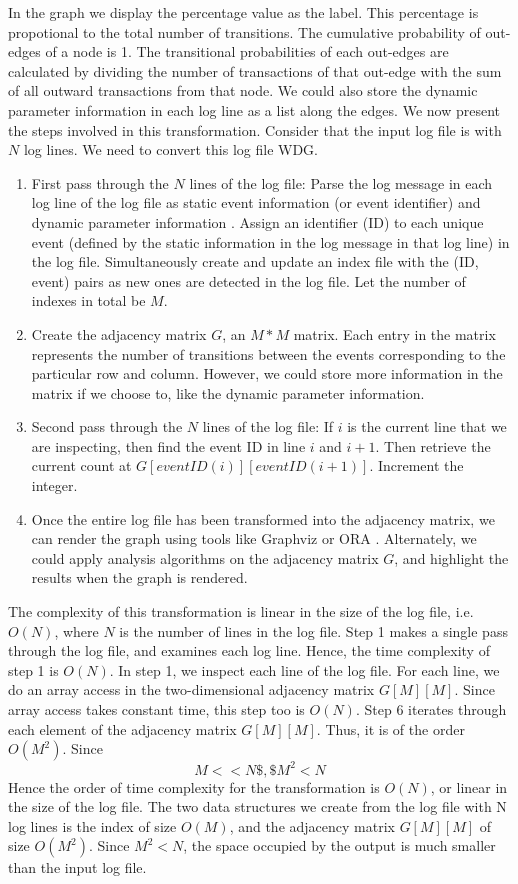 \begin{enumerate}
In the graph we display the percentage value as the label. This percentage is propotional to the total number of transitions.  The cumulative probability of out-edges of a node is 1. The transitional probabilities of each out-edges are calculated by dividing the number of transactions of that out-edge with the sum of all outward transactions from that node. We could also store the dynamic parameter information in each log line as a list along the edges. We now present the steps involved in this transformation. Consider that the input log file is with $N$ log lines. We need to convert this log file WDG.
\begin{enumerate}
\item First pass through the $N$ lines of the log file: Parse the log message in each log line of the log file as static event information (or event identifier) and dynamic parameter information \cite{mnv10}. Assign an identifier (ID) to each unique event (defined by the static information in the log message in that log line) in the log file. Simultaneously create and update an index file with the (ID, event) pairs as new ones are detected in the log file. Let the number of indexes in total be $M$.
\item Create the adjacency matrix $G$, an $M*M$ matrix. Each entry in the matrix represents the number of transitions between the events corresponding to the particular row and column. However, we could store more information in the matrix if we choose to, like the dynamic parameter information. 
\item Second pass through the $N$ lines of the log file: If $i$ is the current line that we are inspecting, then find the event ID in line $i$ and $i+1$. Then retrieve the current count at $G[eventID(i)][eventID(i+1)]$. Increment the integer.
\item Once the entire log file has been transformed into the adjacency matrix, we can render the graph using tools like Graphviz \cite{gviz} or ORA \cite{ora}.  Alternately, we could apply analysis algorithms on the adjacency matrix $G$, and highlight the results when the graph is rendered.
\end{enumerate}

The complexity of this transformation is linear in the size of the log file, i.e. $O(N)$, where $N$ is the number of lines in the log file. Step 1 makes a single pass through the log file, and examines each log line. Hence, the time complexity of step 1 is $O(N)$. In step 1, we inspect each line of the log file. For each line, we do an array access in the two-dimensional adjacency matrix $G[M][M]$. Since array access takes constant time, this step too is $O(N)$. Step 6 iterates through each element of the adjacency matrix $G[M][M]$. Thus, it is of the order $O(M^2)$. Since\[ M << N\$, \$M^2 < N \] Hence the order of time complexity for the transformation is $O(N)$, or linear in the size of the log file. The two data structures we create from the log file with N log lines is the index of size $O(M)$, and the adjacency matrix $G[M][M]$ of size $O(M^2)$. Since $M^2 < N$, the space occupied by the output is much smaller than the input log file.


\end{enumerate}
